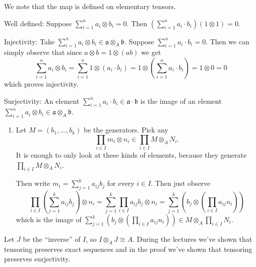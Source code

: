 \newcommand{\sheet}{6}




\maketitle

\begin{exercise}{1}
    We note that the map is defined on elementary tensors.

    Well defined:
    Suppose $\sum^n_{i=1} a_i \otimes b_i = 0$. Then $(\sum^n_{i=1} a_i \cdot
    b_i) (1 \otimes 1) = 0$.

    Injectivity:
    Take $\sum^n_{i=1} a_i \otimes b_i \in \mathfrak{a} \otimes_A \mathfrak{b}$.
    Suppose $\sum^n_{i=1} a_i \cdot b_i = 0$. Then we can simply observe that
    since $a \otimes b = 1 \otimes (a b)$ we get
    \begin{equation*}
        \sum^n_{i=1} a_i \otimes b_i = 
        \sum^n_{i=1} 1 \otimes (a_i \cdot b_i) = 1 \otimes (\sum^n_{i=1} a_i
        \cdot b_i) = 1 \otimes 0 = 0
    \end{equation*}
    which proves injectivity.

    Surjectivity:
    An element $\sum^n_{i=1} a_i \cdot b_i \in \mathfrak{a} \cdot \mathfrak{b}$
    is the image of an element $\sum^n_{i=1} a_i \otimes b_i \in \mathfrak{a}
    \otimes_A \mathfrak{b}$.
\end{exercise}

\begin{exercise}{2}
    \begin{enumerate}
        \item Let $M = (b_1, \ldots, b_k)$ be the generators. Pick any
            \begin{equation*}
                    \prod_{i \in I} m_i \otimes n_i \in \prod_{i \in I} M \otimes_A
                    N_i.
            \end{equation*}
            It is enough to only look at these kinds of elements, because they
            generate $\prod_{i \in I} M \otimes_A N_i$.

            Then write $m_i = \sum^k_{j = 1} a_{ij} b_j$ for every $i \in I$.
            Then just observe
            \begin{equation*}
                \prod_{i \in I} (\sum^k_{j = 1} a_{ij} b_j) \otimes n_i = 
                \sum^k_{j = 1} \prod_{i \in I} a_{ij} b_j \otimes n_i = 
                \sum^k_{j = 1} \left( b_j \otimes (\prod_{i \in I} a_{ij} n_i)
                \right)
            \end{equation*}
            which is the image of $\sum^k_{j = 1} \left( b_j \otimes (\prod_{i
            \in I} a_{ij} n_i) \right) \in M \otimes_A \prod_{i \in I} N_i$.
    \end{enumerate}
\end{exercise}

\begin{exercise}{3}
\end{exercise}

\begin{exercise}{4}
    Let $J$ be the ``inverse'' of $I$, so $I \otimes_A J \cong A$. During the
    lectures we've shown that tensoring preserves exact sequences and in the
    proof we've shown that tensoring preserves surjectivity.
\end{exercise}


